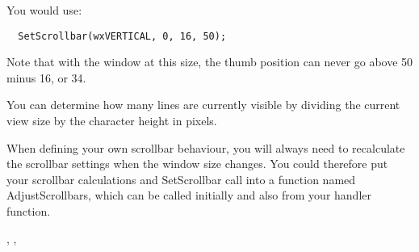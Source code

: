You would use:

{\small%
\begin{verbatim}
  SetScrollbar(wxVERTICAL, 0, 16, 50);
\end{verbatim}
}

Note that with the window at this size, the thumb position can never go
above 50 minus 16, or 34.

You can determine how many lines are currently visible by dividing the current view
size by the character height in pixels.

When defining your own scrollbar behaviour, you will always need to recalculate
the scrollbar settings when the window size changes. You could therefore put your
scrollbar calculations and SetScrollbar
call into a function named AdjustScrollbars, which can be called initially and also
from your  handler function.


,\rtfsp
{}, 

